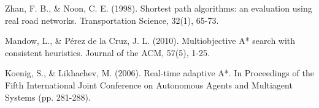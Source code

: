 \documentclass[11pt,a4paper]{report}
\begin{document}
\begin{thebibliography}{99}
 Zhan, F. B., \& Noon, C. E. (1998). Shortest path algorithms: an evaluation using real road networks. Transportation Science, 32(1), 65-73.

 Mandow, L., \& Pérez de la Cruz, J. L. (2010). Multiobjective A* search with consistent heuristics. Journal of the ACM, 57(5), 1-25.

 Koenig, S., \& Likhachev, M. (2006). Real-time adaptive A*. In Proceedings of the Fifth International Joint Conference on Autonomous Agents and Multiagent Systems (pp. 281-288).
\end{thebibliography}
\end{document}
